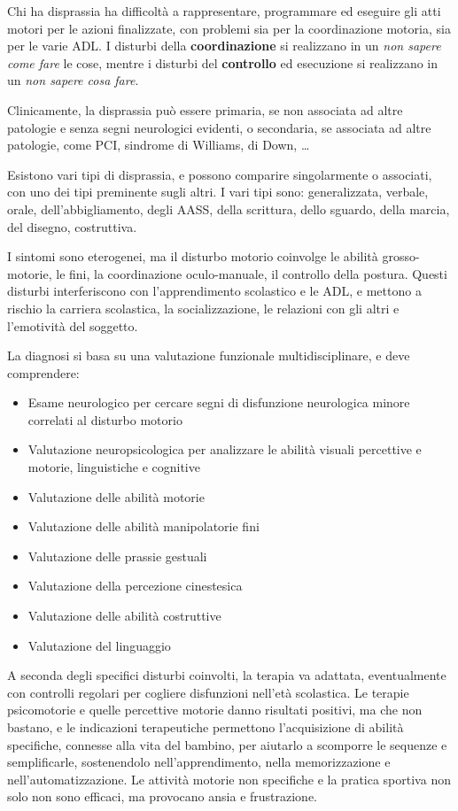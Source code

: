 Chi ha disprassia ha difficoltà a rappresentare, programmare ed eseguire gli atti motori per le azioni finalizzate, con problemi sia per
la coordinazione motoria, sia per le varie ADL. I disturbi della \textbf{coordinazione} si realizzano in un \textit{non sapere come
fare} le cose, mentre i disturbi del \textbf{controllo} ed esecuzione si realizzano in un \textit{non sapere cosa fare}.

Clinicamente, la disprassia può essere primaria, se non associata ad altre patologie e senza segni neurologici evidenti, o secondaria,
se associata ad altre patologie, come PCI, sindrome di Williams, di Down, \dots

Esistono vari tipi di disprassia, e possono comparire singolarmente o associati, con uno dei tipi preminente sugli altri. I vari tipi
sono: generalizzata, verbale, orale, dell'abbigliamento, degli AASS, della scrittura, dello sguardo, della marcia, del disegno,
costruttiva.

I sintomi sono eterogenei, ma il disturbo motorio coinvolge le abilità grosso-motorie, le fini, la coordinazione oculo-manuale, il
controllo della postura. Questi disturbi interferiscono con l'apprendimento scolastico e le ADL, e mettono a rischio la carriera
scolastica, la socializzazione, le relazioni con gli altri e l'emotività del soggetto.

La diagnosi si basa su una valutazione funzionale multidisciplinare, e deve comprendere:
\begin{itemize}
\item Esame neurologico per cercare segni di disfunzione neurologica minore correlati al disturbo motorio
\item Valutazione neuropsicologica per analizzare le abilità visuali percettive e motorie, linguistiche e cognitive
\item Valutazione delle abilità motorie
\item Valutazione delle abilità manipolatorie fini
\item Valutazione delle prassie gestuali
\item Valutazione della percezione cinestesica
\item Valutazione delle abilità costruttive
\item Valutazione del linguaggio
\end{itemize}

A seconda degli specifici disturbi coinvolti, la terapia va adattata, eventualmente con controlli regolari per cogliere disfunzioni
nell'età scolastica. Le terapie psicomotorie e quelle percettive motorie danno risultati positivi, ma che non bastano, e le indicazioni
terapeutiche permettono l'acquisizione di abilità specifiche, connesse alla vita del bambino, per aiutarlo a scomporre le sequenze e
semplificarle, sostenendolo nell'apprendimento, nella memorizzazione e nell'automatizzazione.
Le attività motorie non specifiche e la pratica sportiva non solo non sono efficaci, ma provocano ansia e frustrazione.
